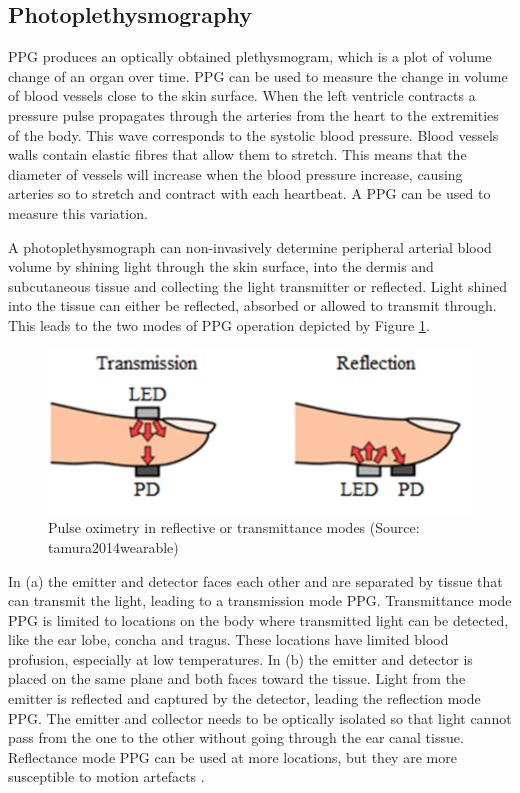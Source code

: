 \subsection{Photoplethysmography}
PPG produces an optically obtained plethysmogram, which is a plot of volume change of an organ over time. PPG can be used to measure the change in volume of blood vessels close to the skin surface. When the left ventricle contracts a pressure pulse propagates through the arteries from the heart to the extremities of the body. This wave corresponds to the systolic blood pressure. Blood vessels walls contain elastic fibres that allow them to stretch. This means that the diameter of vessels will increase when the blood pressure increase, causing   arteries so to stretch and contract with each heartbeat. A PPG can be used to measure this variation.

\medskip

A photoplethysmograph can non-invasively determine peripheral arterial blood volume by shining light through the skin surface, into the dermis and subcutaneous tissue and collecting the light transmitter or reflected. Light shined into the tissue can either be reflected, absorbed or allowed to transmit through. This leads to the two modes of PPG operation depicted by Figure \ref{fig:PulseOxiModes}.

\medskip
 
\begin{figure}[h]
   \centering
   \includegraphics[scale=0.8]{figs/PulseOxiModes}
   \caption{Pulse oximetry in reflective or transmittance modes (Source: tamura2014wearable)}
   \label{fig:PulseOxiModes}
\end{figure}

In (a) the emitter and detector faces each other and are separated by tissue that can transmit the light, leading to a transmission mode PPG. Transmittance mode PPG is limited to locations on the body where transmitted light can be detected, like the ear lobe, concha and tragus. These locations have limited blood profusion, especially at low temperatures. In (b) the emitter and detector is placed on the same plane and both faces toward the tissue. Light from the emitter is reflected and captured by the detector, leading the reflection mode PPG. The emitter and collector needs to be optically isolated so that light cannot pass from the one to the other without going through the ear canal tissue. Reflectance mode PPG can be used at more locations, but they are more susceptible to motion artefacts \citep{tamura2014wearable}.

